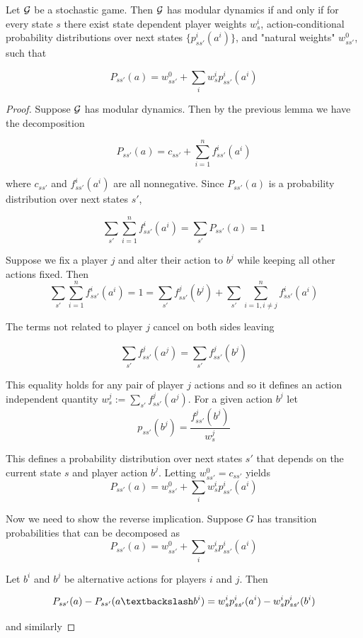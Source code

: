 \begin{thm}
Let $\mathcal{G}$ be a stochastic game. Then $\mathcal{G}$ has modular dynamics if and only if for every state $s$ there exist state dependent player weights $w^i_s$, action-conditional probability distributions over next states $\{p^i_{ss'}(a^i) \}$, and "natural weights" $w^0_{ss'}$,  such that

$$
P_{ss'}(a) = w_{ss'}^0 + \sum_{i} w^i_s p^i_{ss'}(a^i)
$$

\begin{proof}

Suppose $\mathcal{G}$ has modular dynamics. Then by the previous lemma we have the decomposition

$$
P_{ss'}(a) = c_{ss'} + \sum_{i=1}^n f^i_{ss'}(a^i)
$$

where $c_{ss'}$ and $f^i_{ss'}(a^i)$ are all nonnegative. Since $P_{ss'}(a)$ is a probability distribution over next states $s'$, 

$$
\sum_{s'} \sum_{i=1}^n f^i_{ss'}(a^i) = \sum_{s'} P_{ss'}(a) = 1
$$

Suppose we fix a player $j$ and alter their action to $b^j$ while keeping all other actions fixed. Then
$$
\sum_{s'} \sum_{i=1}^n f^i_{ss'}(a^i) = 1 = \sum_{s'} f^j_{ss'}(b^j) + \sum_{s'} \sum_{i=1, i \neq j}^n f^i_{ss'}(a^i)
$$

The terms not related to player $j$ cancel on both sides leaving

$$
\sum_{s'} f^j_{ss'}(a^j) = \sum_{s'} f^j_{ss'}(b^j)
$$

This equality holds for any pair of player $j$ actions and so it defines an action independent quantity $w_{s}^j := \sum_{s'} f^j_{ss'}(a^j)$. For a given action $b^j$ let
$$
p_{ss'}(b^j) = \dfrac{f^j_{ss'}(b^j)}{w_s^j}
$$

This defines a probability distribution over next states $s'$ that depends on the current state $s$ and player action $b^j$. Letting $w^0_{ss'} = c_{ss'}$ yields
$$
P_{ss'}(a) = w_{ss'}^0 + \sum_{i} w^i_{s} p^i_{ss'}(a^i)
$$


Now we need to show the reverse implication. Suppose $G$ has transition probabilities that can be decomposed as
$$
P_{ss'}(a) = w_{ss'}^0 + \sum_{i} w^i_{s} p^i_{ss'}(a^i)
$$

Let $b^i$ and $b^j$ be alternative actions for players $i$ and $j$. Then

$$
P_{ss'}(a) - P_{ss'}(\asub{a}{b^i}) = w^{i}_{s}p^i_{ss'}(a^i) - w^{i}_{s}p^i_{ss'}(b^i)
$$

and similarly


\end{proof}
\end{thm}
